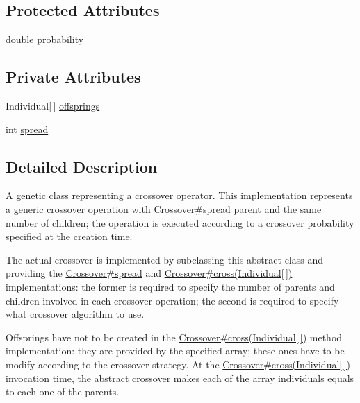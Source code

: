 \subsection*{Protected Attributes}
\begin{DoxyCompactItemize}
\item 
double \hyperlink{classjenes_1_1stage_1_1operator_1_1_crossover_3_01_t_01extends_01_chromosome_01_4_a2b4aec7312a223ba84862f7848b14542}{probability}
\end{DoxyCompactItemize}
\subsection*{Private Attributes}
\begin{DoxyCompactItemize}
\item 
Individual\mbox{[}$\,$\mbox{]} \hyperlink{classjenes_1_1stage_1_1operator_1_1_crossover_3_01_t_01extends_01_chromosome_01_4_ac25f80174c265f930c316c2fb4bc7c5c}{offsprings}
\item 
int \hyperlink{classjenes_1_1stage_1_1operator_1_1_crossover_3_01_t_01extends_01_chromosome_01_4_ac70ed1d50508b2c367559c46e1f39453}{spread}
\end{DoxyCompactItemize}


\subsection{Detailed Description}
A genetic class representing a crossover operator. This implementation represents a generic crossover operation with \hyperlink{}{Crossover\#spread} parent and the same number of children; the operation is executed according to a crossover probability specified at the creation time. 

The actual crossover is implemented by subclassing this abstract class and providing the \hyperlink{}{Crossover\#spread} and \hyperlink{}{Crossover\#cross(\-Individual\mbox{[}$\,$\mbox{]})} implementations\-: the former is required to specify the number of parents and children involved in each crossover operation; the second is required to specify what crossover algorithm to use. 

Offsprings have not to be created in the \hyperlink{}{Crossover\#cross(\-Individual\mbox{[}$\,$\mbox{]})} method implementation\-: they are provided by the specified array; these ones have to be modify according to the crossover strategy. At the \hyperlink{}{Crossover\#cross(\-Individual\mbox{[}$\,$\mbox{]})} invocation time, the abstract crossover makes each of the array individuals equals to each one of the parents. 

